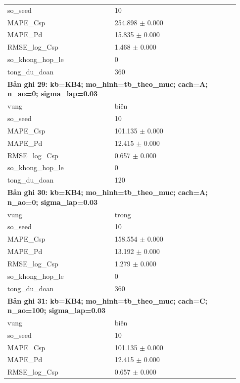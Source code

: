 \begin{longtable}{p{0.43\linewidth}p{0.50\linewidth}}
so\_\allowbreak seed & 10 \\
MAPE\_\allowbreak Csp & 254.898 $\pm$ 0.000 \\
MAPE\_\allowbreak Pd & 15.835 $\pm$ 0.000 \\
RMSE\_\allowbreak log\_\allowbreak Csp & 1.468 $\pm$ 0.000 \\
so\_\allowbreak khong\_\allowbreak hop\_\allowbreak le & 0 \\
tong\_\allowbreak du\_\allowbreak doan & 360 \\
\midrule
\multicolumn{2}{p{0.95\linewidth}}{\textbf{Bản ghi 29: kb=KB4; mo\_hinh=tb\_theo\_muc; cach=A; n\_ao=0; sigma\_lap=0.03}} \\
vung & biên \\
so\_\allowbreak seed & 10 \\
MAPE\_\allowbreak Csp & 101.135 $\pm$ 0.000 \\
MAPE\_\allowbreak Pd & 12.415 $\pm$ 0.000 \\
RMSE\_\allowbreak log\_\allowbreak Csp & 0.657 $\pm$ 0.000 \\
so\_\allowbreak khong\_\allowbreak hop\_\allowbreak le & 0 \\
tong\_\allowbreak du\_\allowbreak doan & 120 \\
\midrule
\multicolumn{2}{p{0.95\linewidth}}{\textbf{Bản ghi 30: kb=KB4; mo\_hinh=tb\_theo\_muc; cach=A; n\_ao=0; sigma\_lap=0.03}} \\
vung & trong \\
so\_\allowbreak seed & 10 \\
MAPE\_\allowbreak Csp & 158.554 $\pm$ 0.000 \\
MAPE\_\allowbreak Pd & 13.192 $\pm$ 0.000 \\
RMSE\_\allowbreak log\_\allowbreak Csp & 1.279 $\pm$ 0.000 \\
so\_\allowbreak khong\_\allowbreak hop\_\allowbreak le & 0 \\
tong\_\allowbreak du\_\allowbreak doan & 360 \\
\midrule
\multicolumn{2}{p{0.95\linewidth}}{\textbf{Bản ghi 31: kb=KB4; mo\_hinh=tb\_theo\_muc; cach=C; n\_ao=100; sigma\_lap=0.03}} \\
vung & biên \\
so\_\allowbreak seed & 10 \\
MAPE\_\allowbreak Csp & 101.135 $\pm$ 0.000 \\
MAPE\_\allowbreak Pd & 12.415 $\pm$ 0.000 \\
RMSE\_\allowbreak log\_\allowbreak Csp & 0.657 $\pm$ 0.000 \\

\end{longtable}
